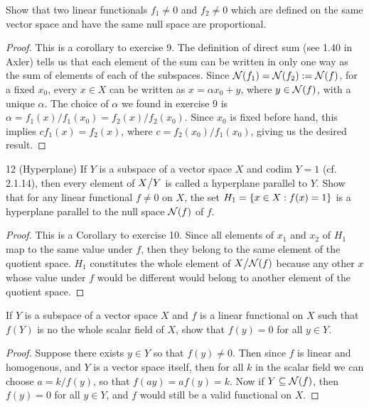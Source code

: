 \begin{exercise}{11}
Show that two linear functionals $f_1\neq 0$ and $f_2\neq 0$ which are defined on the same vector space and have the same null space are proportional.
\end{exercise}
\begin{proof}
This is a corollary to exercise 9.
The definition of direct sum (see 1.40 in Axler) tells us that each element of the sum can be written in only one way as the sum of elements of each of the subspaces.
Since $\mathcal{N}(f_1)=\mathcal{N}(f_2):=\mathcal{N}(f)$, for a fixed $x_0$, every $x\in X$ can be written as $x=\alpha x_0+y$, where $y\in\mathcal{N}(f)$, with a unique $\alpha$.
The choice of $\alpha$ we found in exercise 9 is $\alpha=f_1(x)/f_1(x_0)=f_2(x)/f_2(x_0)$.
Since $x_0$ is fixed before hand, this implies $cf_1(x)=f_2(x)$, where $c=f_2(x_0)/f_1(x_0)$, giving us the desired result.
\end{proof}

\begin{exercise}{12 (Hyperplane)}
If $Y$ is a subspace of a vector space $X$ and $\text{codim }Y=1$ (cf. 2.1.14), then every element of ${\textstyle X}\big/{\textstyle Y}$ is called a hyperplane parallel to $Y$.
Show that for any linear functional $f\neq 0$ on $X$, the set $H_1=\{x\in X: f(x)=1\}$ is a hyperplane parallel to the null space $\mathcal{N}(f)$ of $f$.
\end{exercise}
\begin{proof}
This is a Corollary to exercise 10.
Since all elements of $x_1$ and $x_2$ of $H_1$ map to the same value under $f$, then they belong to the same element of the quotient space.
$H_1$ constitutes the whole element of ${\textstyle X}\big/{\textstyle \mathcal{N}(f)}$ because any other $x$ whose value under $f$ would be different would belong to another element of the quotient space.
\end{proof}

\begin{exercise}{13}
If $Y$ is a subspace of a vector space $X$ and $f$ is a linear functional on $X$ such that $f(Y)$ is no the whole scalar field of $X$, show that $f(y)=0$ for all $y\in Y$.
\end{exercise}
\begin{proof}
Suppose there exists $y\in Y$ so that $f(y)\neq 0$.
Then since $f$ is linear and homogenous, and $Y$ is a vector space itself, then for all $k$ in the scalar field we can choose $a=k/f(y)$, so that $f(ay)=af(y)=k$.
Now if $Y\subseteq\mathcal{N}(f)$, then $f(y)=0$ for all $y\in Y$, and $f$ would still be a valid functional on $X$.
\end{proof}

